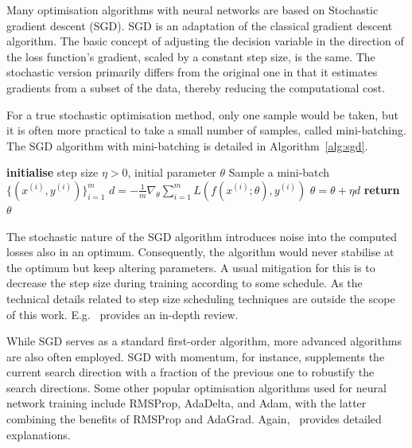 Many optimisation algorithms with neural networks are based on Stochastic gradient descent (SGD).
SGD is an adaptation of the classical gradient descent algorithm.
The basic concept of adjusting the decision variable in the direction of the loss function's gradient, scaled by a constant step size, is the same.
The stochastic version primarily differs from the original one in that it estimates gradients from a subset of the data, thereby reducing the computational cost.

For a true stochastic optimisation method, only one sample would be taken, but it is often more practical to take a small number of samples, called mini-batching.
The SGD algorithm with mini-batching is detailed in Algorithm~\ref{alg:sgd}.

\begin{algorithm}[H]
    \caption{Stochastic gradient descent}
    \label{alg:sgd}
    \begin{algorithmic}[1]
        \State\textbf{initialise} step size $\eta > 0$, initial parameter $\theta$
         
        \State Sample a mini-batch $\{ (x^{(i)}, y^{(i)}) \}_{i=1}^{m}$
        \State $d = -\frac{1}{m} \nabla_{\theta} \sum_{i=1}^{m} L(f(x^{(i)}; \theta), y^{(i)})$ 
        \State $\theta = \theta + \eta d$ 
        \EndWhile
        \State\textbf{return} $\theta$
    \end{algorithmic}
\end{algorithm}

The stochastic nature of the SGD algorithm introduces noise into the computed losses also in an optimum.
Consequently, the algorithm would never stabilise at the optimum but keep altering parameters.
A usual mitigation for this is to decrease the step size during training according to some schedule.
As the technical details related to step size scheduling techniques are outside the scope of this work.
E.g.~\cite{goodfellow} provides an in-depth review.

While SGD serves as a standard first-order algorithm, more advanced algorithms are also often employed.
SGD with momentum, for instance, supplements the current search direction with a fraction of the previous one to robustify the search directions.
Some other popular optimisation algorithms used for neural network training include RMSProp, AdaDelta, and Adam, with the latter combining the benefits of RMSProp and AdaGrad.
Again,~\cite{goodfellow} provides detailed explanations.

